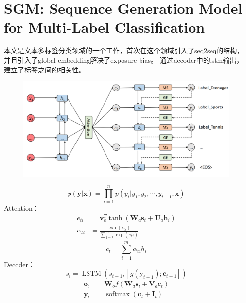 \documentclass[a4paper,UTF8]{article}
\numberwithin{equation}{section}
\begin{document}
\newpage
\section{SGM: Sequence Generation Model for Multi-Label Classification}
本文是文本多标签分类领域的一个工作，首次在这个领域引入了seq2seq的结构，并且引入了global embedding解决了exposure bias。
通过decoder中的lstm输出，建立了标签之间的相关性。
\begin{figure}[H]
	\centering
	\includegraphics[width=\textwidth]{9-1.png}
\end{figure}
\begin{equation}
	p(\boldsymbol{y} | \boldsymbol{x})=\prod_{i=1}^{n} p\left(y_{i} | y_{1}, y_{2}, \cdots, y_{i-1}, \boldsymbol{x}\right)
	\end{equation}
Attention：
\begin{equation}
\begin{aligned} e_{t i} &=\boldsymbol{v}_{a}^{T} \tanh \left(\boldsymbol{W}_{a} \boldsymbol{s}_{t}+\boldsymbol{U}_{a} \boldsymbol{h}_{i}\right) \\ \alpha_{t i} &=\frac{\exp \left(e_{t i}\right)}{\sum_{j=1}^{m} \exp \left(e_{t j}\right)} \end{aligned}
\end{equation}
\begin{equation}
	c_{t}=\sum_{i=1}^{m} \alpha_{t i} h_{i}
	\end{equation}
Decoder：
\begin{equation}
	s_{t}=\operatorname{LSTM}\left(s_{t-1},\left[g\left(\boldsymbol{y}_{t-1}\right) ; \boldsymbol{c}_{t-1}\right]\right)
	\end{equation}
	\begin{equation}
	\begin{aligned} \boldsymbol{o}_{t} &=\boldsymbol{W}_{o} f\left(\boldsymbol{W}_{d} \boldsymbol{s}_{t}+\boldsymbol{V}_{d} \boldsymbol{c}_{t}\right) \\ \boldsymbol{y}_{t} &=\operatorname{softmax}\left(\boldsymbol{o}_{t}+\boldsymbol{I}_{t}\right) \end{aligned}
	\end{equation}
\end{document}
